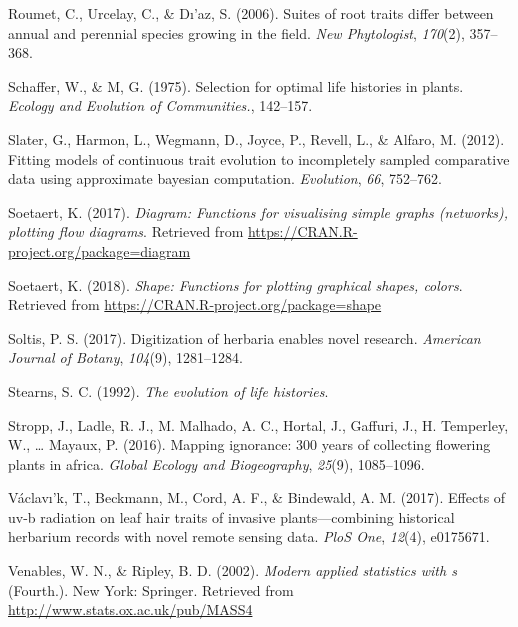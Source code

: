 \documentclass[man,floatsintext]{apa6}
\theoremstyle{definition}
\theoremstyle{definition}
\theoremstyle{definition}
\theoremstyle{remark}
\begin{document}
\leavevmode\hypertarget{ref-roumet2006suites}{}%
Roumet, C., Urcelay, C., \& Dı'az, S. (2006). Suites of root traits
differ between annual and perennial species growing in the field.
\emph{New Phytologist}, \emph{170}(2), 357--368.

\leavevmode\hypertarget{ref-schaffer1975selection}{}%
Schaffer, W., \& M, G. (1975). Selection for optimal life histories in
plants. \emph{Ecology and Evolution of Communities.}, 142--157.

\leavevmode\hypertarget{ref-R-geiger_c}{}%
Slater, G., Harmon, L., Wegmann, D., Joyce, P., Revell, L., \& Alfaro,
M. (2012). Fitting models of continuous trait evolution to incompletely
sampled comparative data using approximate bayesian computation.
\emph{Evolution}, \emph{66}, 752--762.

\leavevmode\hypertarget{ref-R-diagram}{}%
Soetaert, K. (2017). \emph{Diagram: Functions for visualising simple
graphs (networks), plotting flow diagrams}. Retrieved from
\url{https://CRAN.R-project.org/package=diagram}

\leavevmode\hypertarget{ref-R-shape}{}%
Soetaert, K. (2018). \emph{Shape: Functions for plotting graphical
shapes, colors}. Retrieved from
\url{https://CRAN.R-project.org/package=shape}

\leavevmode\hypertarget{ref-soltis2017digitization}{}%
Soltis, P. S. (2017). Digitization of herbaria enables novel research.
\emph{American Journal of Botany}, \emph{104}(9), 1281--1284.

\leavevmode\hypertarget{ref-stearns1992evolution}{}%
Stearns, S. C. (1992). \emph{The evolution of life histories}.

\leavevmode\hypertarget{ref-stropp2016mapping}{}%
Stropp, J., Ladle, R. J., M. Malhado, A. C., Hortal, J., Gaffuri, J., H.
Temperley, W., \ldots{} Mayaux, P. (2016). Mapping ignorance: 300 years
of collecting flowering plants in africa. \emph{Global Ecology and
Biogeography}, \emph{25}(9), 1085--1096.

\leavevmode\hypertarget{ref-vaclavik2017effects}{}%
Václavı'k, T., Beckmann, M., Cord, A. F., \& Bindewald, A. M. (2017).
Effects of uv-b radiation on leaf hair traits of invasive
plants---combining historical herbarium records with novel remote
sensing data. \emph{PloS One}, \emph{12}(4), e0175671.

\leavevmode\hypertarget{ref-R-MASS}{}%
Venables, W. N., \& Ripley, B. D. (2002). \emph{Modern applied
statistics with s} (Fourth.). New York: Springer. Retrieved from
\url{http://www.stats.ox.ac.uk/pub/MASS4}
\end{document}
